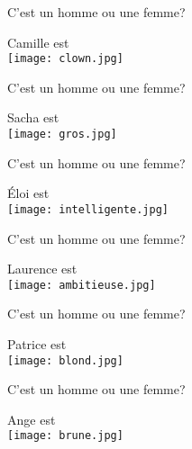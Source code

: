 \begin{frame}{C'est un homme ou une femme?}
  \begin{center}
    Camille est \underline{} \\
    \texttt{[image: clown.jpg]}
  \end{center}
\end{frame}

\begin{frame}{C'est un homme ou une femme?}
  \begin{center}
    Sacha est \underline{} \\
    \texttt{[image: gros.jpg]}
  \end{center}
\end{frame}

\begin{frame}{C'est un homme ou une femme?}
  \begin{center}
    Éloi est \underline{} \\
    \texttt{[image: intelligente.jpg]}
  \end{center}
\end{frame}

\begin{frame}{C'est un homme ou une femme?}
  \begin{center}
    Laurence est \underline{} \\
    \texttt{[image: ambitieuse.jpg]}
  \end{center}
\end{frame}

\begin{frame}{C'est un homme ou une femme?}
  \begin{center}
    Patrice est \underline{} \\
    \texttt{[image: blond.jpg]}
  \end{center}
\end{frame}

\begin{frame}{C'est un homme ou une femme?}
  \begin{center}
    Ange est \underline{} \\
    \texttt{[image: brune.jpg]}
  \end{center}
\end{frame}
